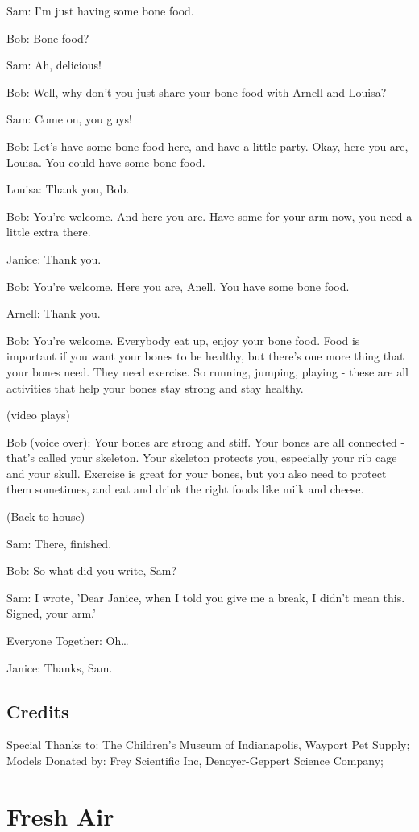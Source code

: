 Sam: I'm just having some bone food.

Bob: Bone food?

Sam: Ah, delicious!

Bob: Well, why don't you just share your bone food with Arnell and Louisa?

Sam: Come on, you guys!

Bob: Let's have some bone food here, and have a little party. Okay, here you are, Louisa. You could have some bone food.

Louisa: Thank you, Bob.

Bob: You're welcome. And here you are. Have some for your arm now, you need a little extra there.

Janice: Thank you.

Bob: You're welcome. Here you are, Anell. You have some bone food.

Arnell: Thank you.

Bob: You're welcome. Everybody eat up, enjoy your bone food. Food is important if you want your bones to be healthy, but there's one more thing that your bones need. They need exercise. So running, jumping, playing - these are all activities that help your bones stay strong and stay healthy.

(video plays)

Bob (voice over): Your bones are strong and stiff. Your bones are all connected - that's called your skeleton. Your skeleton protects you, especially your rib cage and your skull. Exercise is great for your bones, but you also need to protect them sometimes, and eat and drink the right foods like milk and cheese.

(Back to house)

Sam: There, finished.

Bob: So what did you write, Sam?

Sam: I wrote, 'Dear Janice, when I told you give me a break, I didn't mean this. Signed, your arm.'

Everyone Together: Oh\dots

Janice: Thanks, Sam.

\subsection{Credits}

Special Thanks to: The Children's Museum of Indianapolis, Wayport Pet Supply;
Models Donated by: Frey Scientific Inc, Denoyer-Geppert Science Company;

\section{Fresh Air}

